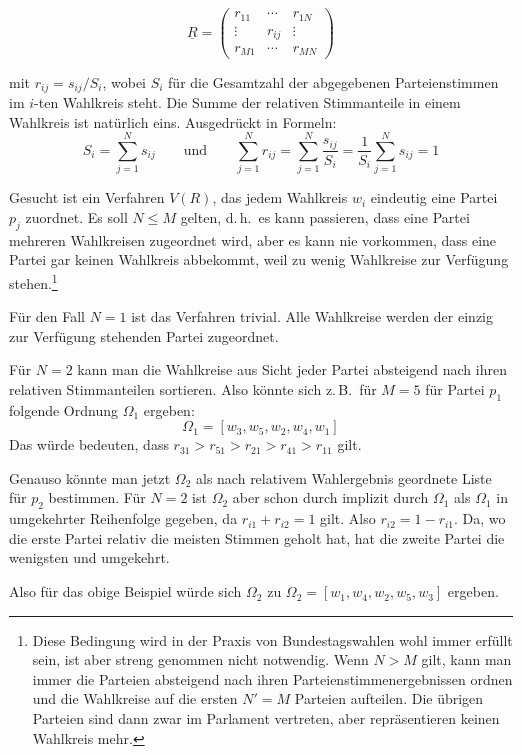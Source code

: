 \[
  \underline{R} = \begin{pmatrix}
    r_{11} & \cdots & r_{1N} \\
    \vdots & r_{ij} & \vdots \\
    r_{M1} & \cdots & r_{MN}
  \end{pmatrix}
\]

mit $r_{ij} = s_{ij}/S_i$, wobei $S_i$ für die Gesamtzahl der abgegebenen Parteienstimmen im
$i$-ten Wahlkreis steht. Die Summe der relativen Stimmanteile in einem Wahlkreis ist natürlich
eins. Ausgedrückt in Formeln:
\[
  S_i = \sum_{j=1}^{N} s_{ij}
  \qquad \text{und} \qquad
  \sum_{j=1}^{N} r_{ij} = \sum_{j=1}^{N} \frac{s_{ij}}{S_i}
    = \frac{1}{S_i}\sum_{j=1}^{N} s_{ij} = 1
\]

Gesucht ist ein Verfahren $V(R)$, das jedem Wahlkreis $w_i$ eindeutig eine Partei $p_j$ zuordnet.
Es soll $N \leq M$ gelten, d.\,h.\ es kann passieren, dass eine Partei mehreren Wahlkreisen
zugeordnet wird, aber es kann nie vorkommen, dass eine Partei gar keinen Wahlkreis abbekommt,
weil zu wenig Wahlkreise zur Verfügung stehen.\footnote{Diese Bedingung wird in der Praxis von
Bundestagswahlen wohl immer erfüllt sein, ist aber streng genommen nicht notwendig. Wenn $N > M$
gilt, kann man immer die Parteien absteigend nach ihren Parteienstimmenergebnissen ordnen und die
Wahlkreise auf die ersten $N' = M$ Parteien aufteilen. Die übrigen Parteien sind dann zwar im
Parlament vertreten, aber repräsentieren keinen Wahlkreis mehr.}

Für den Fall $N = 1$ ist das Verfahren trivial. Alle Wahlkreise werden der einzig zur Verfügung
stehenden Partei zugeordnet.

Für $N = 2$ kann man die Wahlkreise aus Sicht jeder Partei absteigend nach ihren relativen
Stimmanteilen sortieren. Also könnte sich z.\,B.\ für $M = 5$ für Partei $p_1$ folgende Ordnung
$\Omega_1$ ergeben:
\[
  \Omega_1 = [w_3, w_5, w_2, w_4, w_1]
\]
Das würde bedeuten, dass $r_{31} > r_{51} > r_{21} > r_{41} > r_{11}$ gilt.

Genauso könnte man jetzt $\Omega_2$ als nach relativem Wahlergebnis geordnete Liste für $p_2$
bestimmen. Für $N = 2$ ist $\Omega_2$ aber schon durch implizit durch $\Omega_1$ als $\Omega_1$ in
umgekehrter Reihenfolge gegeben, da $r_{i1} + r_{i2} = 1$ gilt. Also $r_{i2} = 1 - r_{i1}$. Da,
wo die erste Partei relativ die meisten Stimmen geholt hat, hat die zweite Partei die wenigsten
und umgekehrt.

Also für das obige Beispiel würde sich $\Omega_2$ zu $\Omega_2 = [w_1, w_4, w_2, w_5, w_3]$
ergeben.

